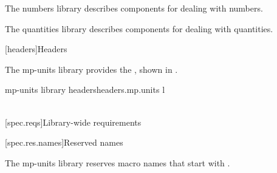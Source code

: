 \pnum
The numbers library
describes components for dealing with numbers.

\pnum
The quantities library
describes components for dealing with quantities.

[headers]{Headers}

\pnum
The mp-units library provides the
,
shown in .

\begin{multicolfloattable}{mp-units library headers}{headers.mp.units}
{l}
 \\
 \\
\end{multicolfloattable}

[spec.reqs]{Library-wide requirements}

[spec.res.names]{Reserved names}

\pnum
The mp-units library reserves macro names that start with
.
